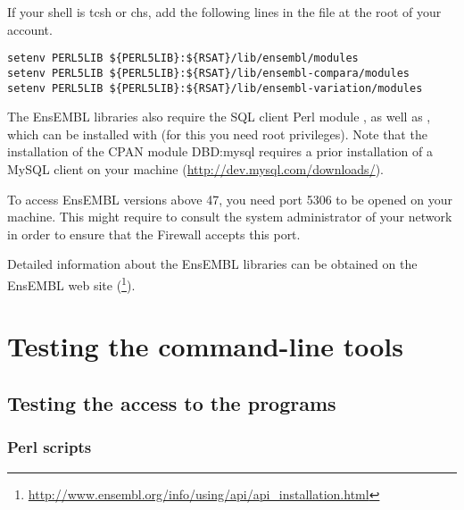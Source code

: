 \documentclass{book}
\begin{document}
If your shell is tcsh or chs, add the following lines in the file
 at the root of your account.

\begin{footnotesize}
\begin{verbatim}
setenv PERL5LIB ${PERL5LIB}:${RSAT}/lib/ensembl/modules
setenv PERL5LIB ${PERL5LIB}:${RSAT}/lib/ensembl-compara/modules
setenv PERL5LIB ${PERL5LIB}:${RSAT}/lib/ensembl-variation/modules
\end{verbatim}
\end{footnotesize}



The EnsEMBL libraries also require the SQL client Perl module
, as well as , which can be installed with
 (for this you need root privileges). Note that the
installation of the CPAN module DBD:mysql requires a prior
installation of a MySQL client on your machine
(\url{http://dev.mysql.com/downloads/}).

To access EnsEMBL versions above 47, you need port 5306 to be opened
on your machine. This might require to consult the system
administrator of your network in order to ensure that the Firewall
accepts this port.

Detailed information about the EnsEMBL libraries can be obtained on
the EnsEMBL web site
(\footnote{\url{http://www.ensembl.org/info/using/api/api\_installation.html}}).








\chapter{Testing the command-line tools}

\section{Testing the access to the programs}

\subsection{Perl scripts}
\end{document}
